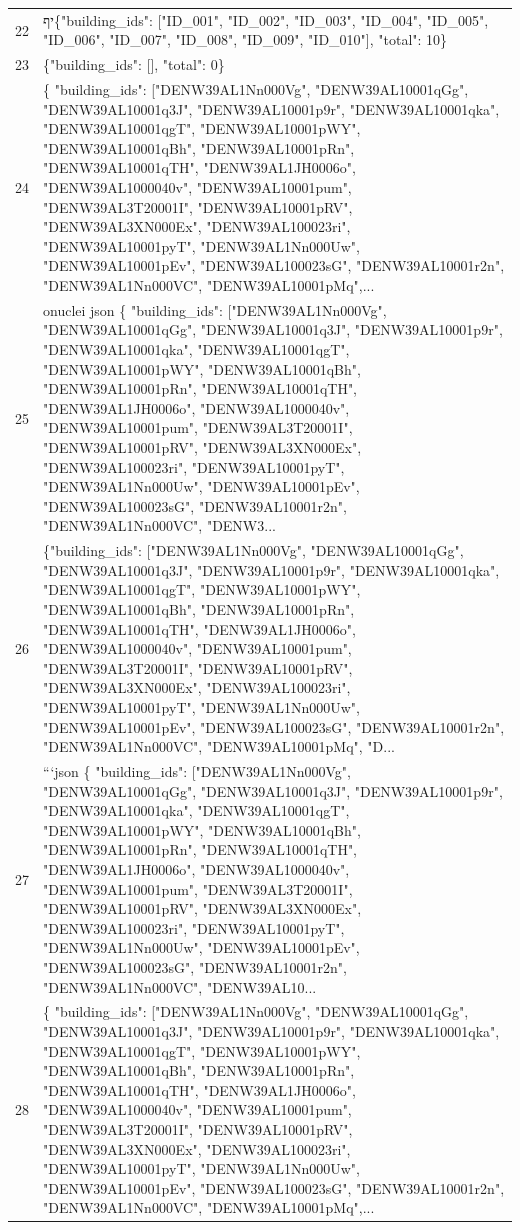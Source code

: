 \documentclass[a4paper,11pt]{article}
\begin{document}
\begin{table}[ht]
\begin{tabular}{r p{12cm}}
22 & יף\{"building\_ids": ["ID\_001", "ID\_002", "ID\_003", "ID\_004", "ID\_005", "ID\_006", "ID\_007", "ID\_008", "ID\_009", "ID\_010"], "total": 10\} \\
23 & \{"building\_ids": [], "total": 0\} \\
24 & \{
  "building\_ids": ["DENW39AL1Nn000Vg", "DENW39AL10001qGg", "DENW39AL10001q3J", "DENW39AL10001p9r", "DENW39AL10001qka", "DENW39AL10001qgT", "DENW39AL10001pWY", "DENW39AL10001qBh", "DENW39AL10001pRn", "DENW39AL10001qTH", "DENW39AL1JH0006o", "DENW39AL1000040v", "DENW39AL10001pum", "DENW39AL3T20001I", "DENW39AL10001pRV", "DENW39AL3XN000Ex", "DENW39AL100023ri", "DENW39AL10001pyT", "DENW39AL1Nn000Uw", "DENW39AL10001pEv", "DENW39AL100023sG", "DENW39AL10001r2n", "DENW39AL1Nn000VC", "DENW39AL10001pMq",... \\
25 & onuclei json
\{
  "building\_ids": ["DENW39AL1Nn000Vg", "DENW39AL10001qGg", "DENW39AL10001q3J", "DENW39AL10001p9r", "DENW39AL10001qka", "DENW39AL10001qgT", "DENW39AL10001pWY", "DENW39AL10001qBh", "DENW39AL10001pRn", "DENW39AL10001qTH", "DENW39AL1JH0006o", "DENW39AL1000040v", "DENW39AL10001pum", "DENW39AL3T20001I", "DENW39AL10001pRV", "DENW39AL3XN000Ex", "DENW39AL100023ri", "DENW39AL10001pyT", "DENW39AL1Nn000Uw", "DENW39AL10001pEv", "DENW39AL100023sG", "DENW39AL10001r2n", "DENW39AL1Nn000VC", "DENW3... \\
26 & \{"building\_ids": ["DENW39AL1Nn000Vg", "DENW39AL10001qGg", "DENW39AL10001q3J", "DENW39AL10001p9r", "DENW39AL10001qka", "DENW39AL10001qgT", "DENW39AL10001pWY", "DENW39AL10001qBh", "DENW39AL10001pRn", "DENW39AL10001qTH", "DENW39AL1JH0006o", "DENW39AL1000040v", "DENW39AL10001pum", "DENW39AL3T20001I", "DENW39AL10001pRV", "DENW39AL3XN000Ex", "DENW39AL100023ri", "DENW39AL10001pyT", "DENW39AL1Nn000Uw", "DENW39AL10001pEv", "DENW39AL100023sG", "DENW39AL10001r2n", "DENW39AL1Nn000VC", "DENW39AL10001pMq", "D... \\
27 & ```json
\{
  "building\_ids": ["DENW39AL1Nn000Vg", "DENW39AL10001qGg", "DENW39AL10001q3J", "DENW39AL10001p9r", "DENW39AL10001qka", "DENW39AL10001qgT", "DENW39AL10001pWY", "DENW39AL10001qBh", "DENW39AL10001pRn", "DENW39AL10001qTH", "DENW39AL1JH0006o", "DENW39AL1000040v", "DENW39AL10001pum", "DENW39AL3T20001I", "DENW39AL10001pRV", "DENW39AL3XN000Ex", "DENW39AL100023ri", "DENW39AL10001pyT", "DENW39AL1Nn000Uw", "DENW39AL10001pEv", "DENW39AL100023sG", "DENW39AL10001r2n", "DENW39AL1Nn000VC", "DENW39AL10... \\
28 & \{
  "building\_ids": ["DENW39AL1Nn000Vg", "DENW39AL10001qGg", "DENW39AL10001q3J", "DENW39AL10001p9r", "DENW39AL10001qka", "DENW39AL10001qgT", "DENW39AL10001pWY", "DENW39AL10001qBh", "DENW39AL10001pRn", "DENW39AL10001qTH", "DENW39AL1JH0006o", "DENW39AL1000040v", "DENW39AL10001pum", "DENW39AL3T20001I", "DENW39AL10001pRV", "DENW39AL3XN000Ex", "DENW39AL100023ri", "DENW39AL10001pyT", "DENW39AL1Nn000Uw", "DENW39AL10001pEv", "DENW39AL100023sG", "DENW39AL10001r2n", "DENW39AL1Nn000VC", "DENW39AL10001pMq",... \\

\end{tabular}
\end{table}
\end{document}
